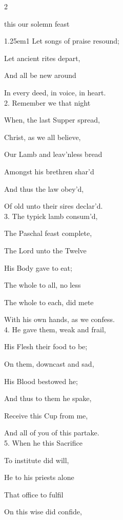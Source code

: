 \begin{paracol}{2}

\mattinsInvitatoryHymn
{} this our solemn feast


\begin{hangparas}{1.25em}{1}
Let songs of praise resound;

Let ancient rites depart,

And all be new around

In every deed, in voice, in heart.\\

2. Remember we that night

When, the last Supper spread,

Christ, as we all believe,

Our Lamb and leav'nless bread

Amongst his brethren shar'd

And thus the law obey'd,

Of old unto their sires declar'd.\\

3. The typick lamb consum'd,

The Paschal feast complete,

The Lord unto the Twelve

His Body gave to eat;

The whole to all, no less

The whole to each, did mete

With his own hands, as we confess.\\

4. He gave them, weak and frail,

His Flesh their food to be;

On them, downcast and sad,

His Blood bestowed he;

And thus to them he spake,

Receive this Cup from me,

And all of you of this partake.\\

5. When he this Sacrifice

To institute did will,

He to his priests alone

That office to fulfil

On this wise did confide,


\end{hangparas}
\end{paracol}
